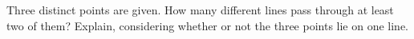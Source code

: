 Three distinct points are given. How many different lines pass through at least two of them? Explain, considering whether or not the three points lie on one line.
